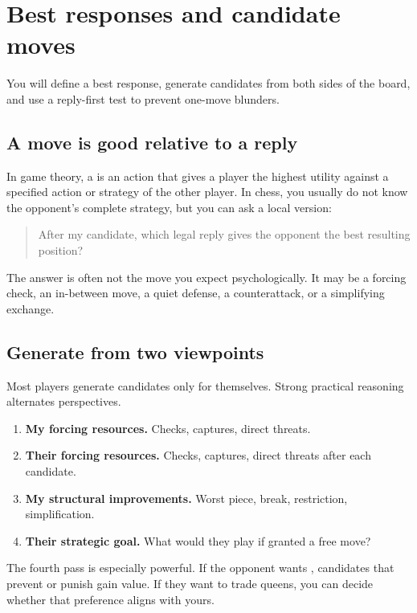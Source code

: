 \chapter{Best responses and candidate moves}
\begin{learningbox}
You will define a best response, generate candidates from both sides of the board, and use a reply-first test to prevent one-move blunders.
\end{learningbox}

\section{A move is good relative to a reply}
In game theory, a  is an action that gives a player the highest utility against a specified action or strategy of the other player. In chess, you usually do not know the opponent's complete strategy, but you can ask a local version:

\begin{quote}
After my candidate, which legal reply gives the opponent the best resulting position?
\end{quote}

The answer is often not the move you expect psychologically. It may be a forcing check, an in-between move, a quiet defense, a counterattack, or a simplifying exchange.

\section{Generate from two viewpoints}
Most players generate candidates only for themselves. Strong practical reasoning alternates perspectives.

\begin{enumerate}[label=\textbf{Pass \arabic*:},leftmargin=4.7em]
\item \textbf{My forcing resources.} Checks, captures, direct threats.
\item \textbf{Their forcing resources.} Checks, captures, direct threats after each candidate.
\item \textbf{My structural improvements.} Worst piece, break, restriction, simplification.
\item \textbf{Their strategic goal.} What would they play if granted a free move?
\end{enumerate}

The fourth pass is especially powerful. If the opponent wants , candidates that prevent or punish  gain value. If they want to trade queens, you can decide whether that preference aligns with yours.

